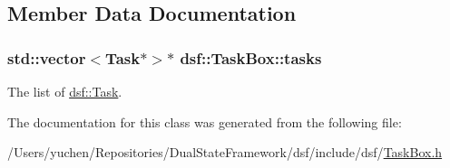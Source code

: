 \subsection{Member Data Documentation}
\hypertarget{classdsf_1_1_task_box_ae13d0d245cacbf7f4019f7ff5486aa79}{}
\subsubsection[{tasks}]{\setlength{\rightskip}{0pt plus 5cm}std\+::vector$<${\bf Task}$\ast$$>$$\ast$ dsf\+::\+Task\+Box\+::tasks\hspace{0.3cm}{\ttfamily [protected]}}\label{classdsf_1_1_task_box_ae13d0d245cacbf7f4019f7ff5486aa79}
The list of \hyperlink{classdsf_1_1_task}{dsf\+::\+Task}. 

The documentation for this class was generated from the following file\+:\begin{DoxyCompactItemize}
\item 
/\+Users/yuchen/\+Repositories/\+Dual\+State\+Framework/dsf/include/dsf/\hyperlink{_task_box_8h}{Task\+Box.\+h}\end{DoxyCompactItemize}
